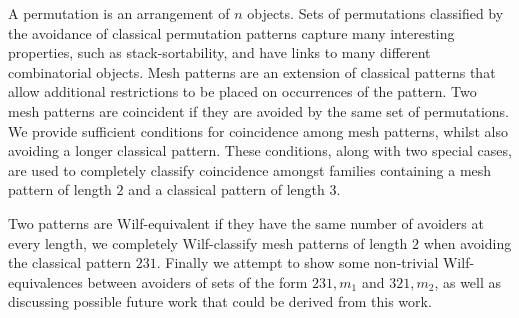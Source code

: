 A permutation is an arrangement of \(n\) objects.
Sets of permutations classified by the avoidance of classical permutation
patterns capture many interesting properties, such as
stack-sortability, and have links to many different combinatorial objects.
Mesh patterns are an extension of classical patterns that allow additional
restrictions to be placed on occurrences of the pattern.
Two mesh patterns are coincident if they are avoided by the same set of
permutations. We provide sufficient conditions for
coincidence among mesh patterns, whilst also avoiding a longer classical
pattern. These conditions, along with two special cases, are used to completely
classify coincidence amongst families containing a mesh pattern of length \(2\)
and a classical pattern of length \(3\).

Two patterns are Wilf-equivalent if they
have the same number of avoiders at every length, we completely
Wilf-classify mesh patterns of length \(2\) when avoiding the classical pattern \(231\).
Finally we attempt to show some non-trivial Wilf-equivalences between avoiders
of sets of the form \(231,m_1\) and \(321,m_2\), as well as discussing possible
future work that could be derived from this work.
